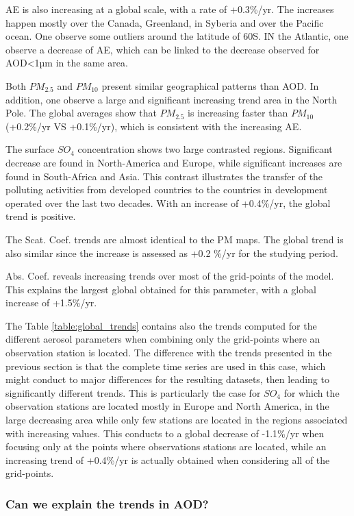 \documentclass[journal abbreviation, manuscript]{copernicus}
\begin{document}
AE is also increasing  at a global scale, with a rate of +0.3\%/yr. The increases happen mostly over the Canada, Greenland, in Syberia and over the Pacific ocean. One observe some outliers around the latitude of 60\textdegree S.
IN the Atlantic, one observe a decrease of AE, which can be linked to the decrease observed for AOD<1µm in the same area.

Both $PM_{2.5}$ and $PM_{10}$ present similar geographical patterns than AOD. In addition, one observe a large and significant increasing trend area in the North Pole. The global averages show that $PM_{2.5}$ is increasing faster than $PM_{10}$  (+0.2\%/yr VS +0.1\%/yr), which is consistent with the increasing AE.

The surface $SO_{4}$ concentration shows two large contrasted regions. Significant decrease are found in North-America and Europe, while significant increases are found in South-Africa and Asia. This contrast illustrates the transfer of the polluting activities from developed countries to the countries in development operated over the last two decades. With an increase of +0.4\%/yr, the global trend is positive.

The Scat. Coef. trends are almost identical to the PM maps. The global trend is also similar since the increase is assessed as +0.2 \%/yr for the studying period.

Abs. Coef. reveals increasing trends over most of the grid-points of the model. This explains the largest global obtained for this parameter, with a global increase of +1.5\%/yr.

The Table \ref{table:global_trends} contains also the trends computed for the different aerosol parameters when combining only the grid-points where an observation station is located. The difference with the trends presented in the previous section is that the complete time series are used in this case, which might conduct to major differences for the resulting datasets, then leading to significantly different trends. This is particularly the case for $SO_{4}$ for which the observation stations are located mostly in Europe and North America, in the large decreasing area while only few stations are located in the regions associated with increasing values. This conducts to a global decrease of -1.1\%/yr when focusing only at the points where observations stations are located, while an increasing trend of +0.4\%/yr is actually obtained when considering all of the grid-points.


\subsubsection{Can we explain the trends in AOD?}
\end{document}
